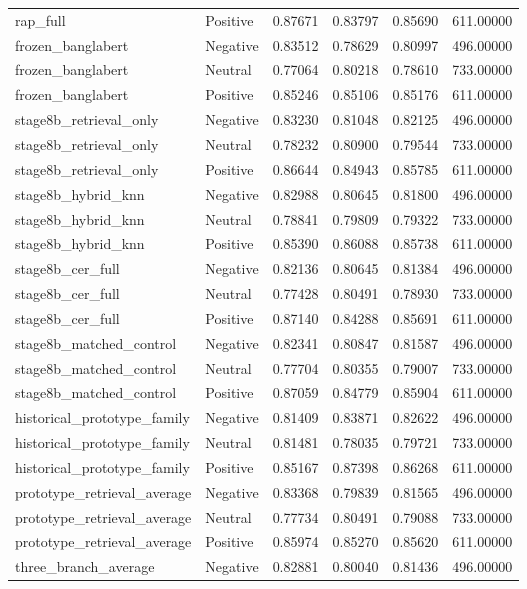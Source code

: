 \begin{tabular}{llrrrr}
rap_full & Positive & 0.87671 & 0.83797 & 0.85690 & 611.00000 \\
frozen_banglabert & Negative & 0.83512 & 0.78629 & 0.80997 & 496.00000 \\
frozen_banglabert & Neutral & 0.77064 & 0.80218 & 0.78610 & 733.00000 \\
frozen_banglabert & Positive & 0.85246 & 0.85106 & 0.85176 & 611.00000 \\
stage8b_retrieval_only & Negative & 0.83230 & 0.81048 & 0.82125 & 496.00000 \\
stage8b_retrieval_only & Neutral & 0.78232 & 0.80900 & 0.79544 & 733.00000 \\
stage8b_retrieval_only & Positive & 0.86644 & 0.84943 & 0.85785 & 611.00000 \\
stage8b_hybrid_knn & Negative & 0.82988 & 0.80645 & 0.81800 & 496.00000 \\
stage8b_hybrid_knn & Neutral & 0.78841 & 0.79809 & 0.79322 & 733.00000 \\
stage8b_hybrid_knn & Positive & 0.85390 & 0.86088 & 0.85738 & 611.00000 \\
stage8b_cer_full & Negative & 0.82136 & 0.80645 & 0.81384 & 496.00000 \\
stage8b_cer_full & Neutral & 0.77428 & 0.80491 & 0.78930 & 733.00000 \\
stage8b_cer_full & Positive & 0.87140 & 0.84288 & 0.85691 & 611.00000 \\
stage8b_matched_control & Negative & 0.82341 & 0.80847 & 0.81587 & 496.00000 \\
stage8b_matched_control & Neutral & 0.77704 & 0.80355 & 0.79007 & 733.00000 \\
stage8b_matched_control & Positive & 0.87059 & 0.84779 & 0.85904 & 611.00000 \\
historical_prototype_family & Negative & 0.81409 & 0.83871 & 0.82622 & 496.00000 \\
historical_prototype_family & Neutral & 0.81481 & 0.78035 & 0.79721 & 733.00000 \\
historical_prototype_family & Positive & 0.85167 & 0.87398 & 0.86268 & 611.00000 \\
prototype_retrieval_average & Negative & 0.83368 & 0.79839 & 0.81565 & 496.00000 \\
prototype_retrieval_average & Neutral & 0.77734 & 0.80491 & 0.79088 & 733.00000 \\
prototype_retrieval_average & Positive & 0.85974 & 0.85270 & 0.85620 & 611.00000 \\
three_branch_average & Negative & 0.82881 & 0.80040 & 0.81436 & 496.00000 \\

\end{tabular}
